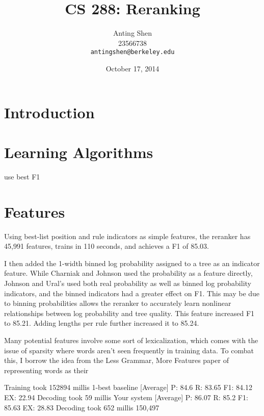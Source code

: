 \documentclass[11pt]{article}
\title{CS 288: Reranking}
\author{Anting Shen \\
  23566738 \\
  {\tt antingshen@berkeley.edu} \\
}
\date{October 17, 2014}
\begin{document}
\maketitle

\section{Introduction}


\section{Learning Algorithms}

use best F1


\section{Features}

Using best-list position and rule indicators as simple features, the reranker has 45,991 features,
trains in 110 seconds, and achieves a F1 of 85.03.

I then added the 1-width binned log probability assigned to a tree as an indicator feature.
While Charniak and Johnson used the probability as a feature directly,
Johnson and Ural's used both real probability as well as binned log probability indicators,
and the binned indicators had a greater effect on F1. This may be due to binning probabilities
allows the reranker to accurately learn nonlinear relationships between log probability and tree quality.
This feature increased F1 to 85.21. Adding lengths per rule further increased it to 85.24.

Many potential features involve some sort of lexicalization, which comes with the issue of sparsity
where words aren't seen frequently in training data. To combat this, I borrow the idea from the
Less Grammar, More Features paper of representing words as their

Training took 152894 millis
1-best baseline
 [Average]  P: 84.6 R: 83.65 F1: 84.12 EX: 22.94
Decoding took 59 millis
Your system
 [Average]  P: 86.07 R: 85.2 F1: 85.63 EX: 28.83
Decoding took 652 millis
 150,497
\end{document}

